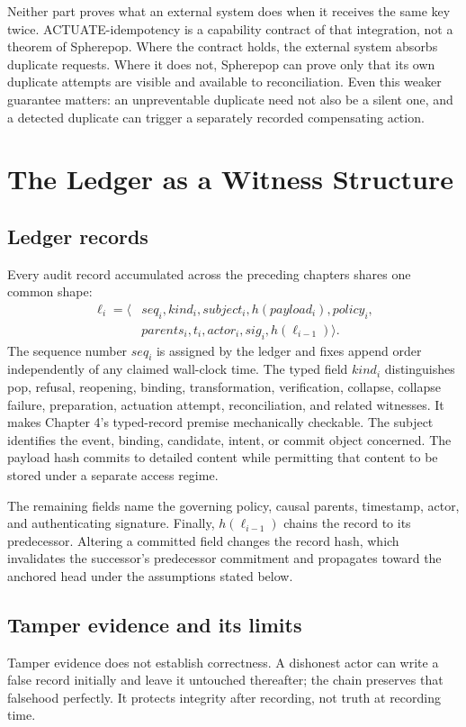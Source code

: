 \documentclass[11pt,openany]{book}
\begin{document}
Neither part proves what an external system does when it receives the same key
twice. ACTUATE-idempotency is a capability contract of that integration, not a
theorem of Spherepop. Where the contract holds, the external system absorbs
duplicate requests. Where it does not, Spherepop can prove only that its own
duplicate attempts are visible and available to reconciliation. Even this
weaker guarantee matters: an unpreventable duplicate need not also be a silent
one, and a detected duplicate can trigger a separately recorded compensating
action.

\chapter{The Ledger as a Witness Structure}
\section{Ledger records}
Every audit record accumulated across the preceding chapters shares one common
shape:
\[
\begin{aligned}
 \ell_i=\langle&seq_i,kind_i,subject_i,h(payload_i),policy_i,\\
                &parents_i,t_i,actor_i,sig_i,h(\ell_{i-1})\rangle.
\end{aligned}
\]
The sequence number \(seq_i\) is assigned by the ledger and fixes append order
independently of any claimed wall-clock time. The typed field \(kind_i\)
distinguishes pop, refusal, reopening, binding, transformation, verification,
collapse, collapse failure, preparation, actuation attempt, reconciliation,
and related witnesses. It makes Chapter 4's typed-record premise mechanically
checkable. The subject identifies the event, binding, candidate, intent, or
commit object concerned. The payload hash commits to detailed content while
permitting that content to be stored under a separate access regime.

The remaining fields name the governing policy, causal parents, timestamp,
actor, and authenticating signature. Finally, \(h(\ell_{i-1})\) chains the
record to its predecessor. Altering a committed field changes the record hash,
which invalidates the successor's predecessor commitment and propagates toward
the anchored head under the assumptions stated below.

\section{Tamper evidence and its limits}
Tamper evidence does not establish correctness. A dishonest actor can write a
false record initially and leave it untouched thereafter; the chain preserves
that falsehood perfectly. It protects integrity after recording, not truth at
recording time.
\end{document}
